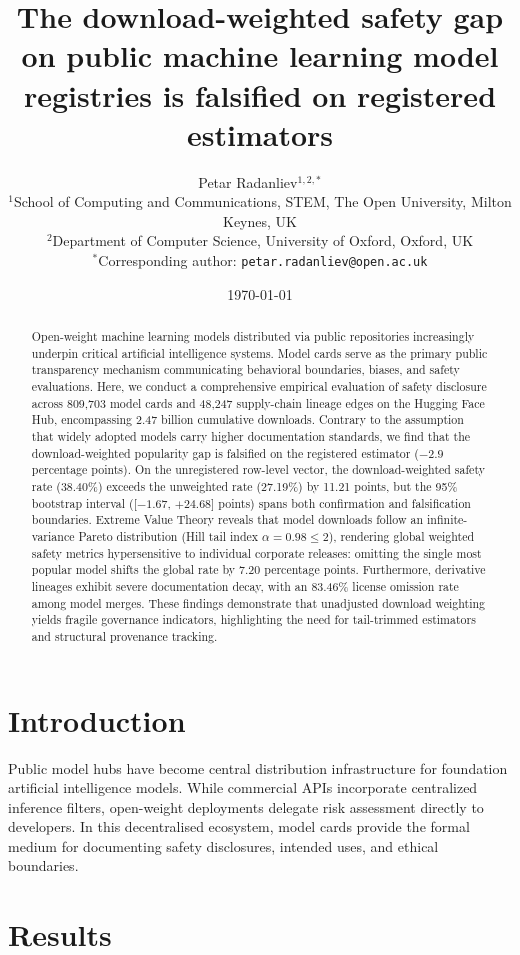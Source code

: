\documentclass[11pt,a4paper]{article}
\title{\textbf{The download-weighted safety gap on public machine learning model registries is falsified on registered estimators}}
\author{
  Petar Radanliev$^{1,2,*}$\\[1ex]
  \small $^{1}$School of Computing and Communications, STEM, The Open University, Milton Keynes, UK\\
  \small $^{2}$Department of Computer Science, University of Oxford, Oxford, UK\\
  \small $^*$Corresponding author: \texttt{petar.radanliev@open.ac.uk}
}
\date{\today}
\begin{document}
\maketitle

\begin{abstract}
Open-weight machine learning models distributed via public repositories increasingly underpin critical artificial intelligence systems. Model cards serve as the primary public transparency mechanism communicating behavioral boundaries, biases, and safety evaluations. Here, we conduct a comprehensive empirical evaluation of safety disclosure across 809,703 model cards and 48,247 supply-chain lineage edges on the Hugging Face Hub, encompassing 2.47 billion cumulative downloads. Contrary to the assumption that widely adopted models carry higher documentation standards, we find that the download-weighted popularity gap is falsified on the registered estimator ($-2.9$ percentage points). On the unregistered row-level vector, the download-weighted safety rate (38.40\%) exceeds the unweighted rate (27.19\%) by 11.21 points, but the 95\% bootstrap interval ([$ -1.67$, $+24.68$] points) spans both confirmation and falsification boundaries. Extreme Value Theory reveals that model downloads follow an infinite-variance Pareto distribution (Hill tail index $\alpha = 0.98 \le 2$), rendering global weighted safety metrics hypersensitive to individual corporate releases: omitting the single most popular model shifts the global rate by 7.20 percentage points. Furthermore, derivative lineages exhibit severe documentation decay, with an 83.46\% license omission rate among model merges. These findings demonstrate that unadjusted download weighting yields fragile governance indicators, highlighting the need for tail-trimmed estimators and structural provenance tracking.
\end{abstract}

\section*{Introduction}
Public model hubs have become central distribution infrastructure for foundation artificial intelligence models. While commercial APIs incorporate centralized inference filters, open-weight deployments delegate risk assessment directly to developers. In this decentralised ecosystem, model cards provide the formal medium for documenting safety disclosures, intended uses, and ethical boundaries.

\section*{Results}
\end{document}
